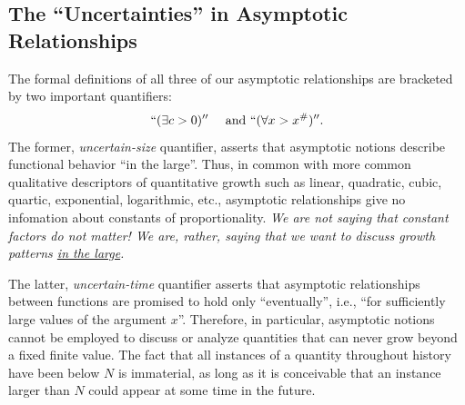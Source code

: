 
\subsection{The ``Uncertainties'' in Asymptotic Relationships}
\label{sec:uncertainties-asymptotics}

The formal definitions of all three of our asymptotic relationships
are bracketed by two important quantifiers:
\[ ``(\exists c >0)'' \ \ \ \mbox{ and } 
 ``(\forall x > x^{\#})''.
\]
The former, {\em uncertain-size} quantifier, asserts that asymptotic
notions describe functional behavior ``in the large''.  Thus, in
common with more common qualitative descriptors of quantitative growth
such as linear, quadratic, cubic, quartic, exponential, logarithmic,
etc., asymptotic relationships give no infomation about constants of
proportionality.  {\em We are not saying that constant factors do not
  matter!  We are, rather, saying that we want to discuss growth
  patterns \underline{in the large}.}

The latter, {\em uncertain-time} quantifier asserts that asymptotic
relationships between functions are promised to hold only
``eventually'', i.e., ``for sufficiently large values of the argument
$x$''.  Therefore, in particular, asymptotic notions cannot be
employed to discuss or analyze quantities that can never grow beyond a
fixed finite value.  The fact that all instances of a quantity
throughout history have been below $N$ is immaterial, as long as it is
conceivable that an instance larger than $N$ could appear at some time
in the future.

